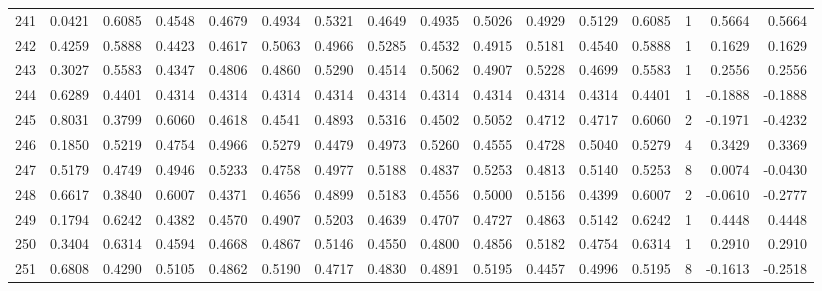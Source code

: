 \begin{tabular}{lrrrrrrrrrrrrrrr}
241 &      0.0421 &  0.6085 &  0.4548 &  0.4679 &  0.4934 &  0.5321 &  0.4649 &  0.4935 &  0.5026 &  0.4929 &   0.5129 &     0.6085 &      1 &                    0.5664 &                     0.5664 \\
242 &      0.4259 &  0.5888 &  0.4423 &  0.4617 &  0.5063 &  0.4966 &  0.5285 &  0.4532 &  0.4915 &  0.5181 &   0.4540 &     0.5888 &      1 &                    0.1629 &                     0.1629 \\
243 &      0.3027 &  0.5583 &  0.4347 &  0.4806 &  0.4860 &  0.5290 &  0.4514 &  0.5062 &  0.4907 &  0.5228 &   0.4699 &     0.5583 &      1 &                    0.2556 &                     0.2556 \\
244 &      0.6289 &  0.4401 &  0.4314 &  0.4314 &  0.4314 &  0.4314 &  0.4314 &  0.4314 &  0.4314 &  0.4314 &   0.4314 &     0.4401 &      1 &                   -0.1888 &                    -0.1888 \\
245 &      0.8031 &  0.3799 &  0.6060 &  0.4618 &  0.4541 &  0.4893 &  0.5316 &  0.4502 &  0.5052 &  0.4712 &   0.4717 &     0.6060 &      2 &                   -0.1971 &                    -0.4232 \\
246 &      0.1850 &  0.5219 &  0.4754 &  0.4966 &  0.5279 &  0.4479 &  0.4973 &  0.5260 &  0.4555 &  0.4728 &   0.5040 &     0.5279 &      4 &                    0.3429 &                     0.3369 \\
247 &      0.5179 &  0.4749 &  0.4946 &  0.5233 &  0.4758 &  0.4977 &  0.5188 &  0.4837 &  0.5253 &  0.4813 &   0.5140 &     0.5253 &      8 &                    0.0074 &                    -0.0430 \\
248 &      0.6617 &  0.3840 &  0.6007 &  0.4371 &  0.4656 &  0.4899 &  0.5183 &  0.4556 &  0.5000 &  0.5156 &   0.4399 &     0.6007 &      2 &                   -0.0610 &                    -0.2777 \\
249 &      0.1794 &  0.6242 &  0.4382 &  0.4570 &  0.4907 &  0.5203 &  0.4639 &  0.4707 &  0.4727 &  0.4863 &   0.5142 &     0.6242 &      1 &                    0.4448 &                     0.4448 \\
250 &      0.3404 &  0.6314 &  0.4594 &  0.4668 &  0.4867 &  0.5146 &  0.4550 &  0.4800 &  0.4856 &  0.5182 &   0.4754 &     0.6314 &      1 &                    0.2910 &                     0.2910 \\
251 &      0.6808 &  0.4290 &  0.5105 &  0.4862 &  0.5190 &  0.4717 &  0.4830 &  0.4891 &  0.5195 &  0.4457 &   0.4996 &     0.5195 &      8 &                   -0.1613 &                    -0.2518 \\

\end{tabular}
